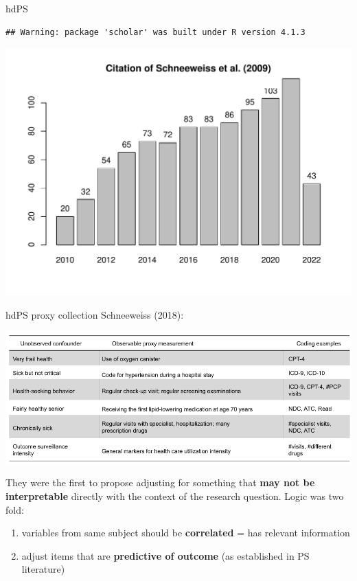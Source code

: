\documentclass[
  ignorenonframetext,
  aspectratio=169]{beamer}
\providecommand{\tightlist}{%
  \setlength{\itemsep}{0pt}\setlength{\parskip}{0pt}}
\begin{document}
\begin{frame}[fragile]{hdPS}
\protect\hypertarget{hdps}{}
\begin{verbatim}
## Warning: package 'scholar' was built under R version 4.1.3
\end{verbatim}

\includegraphics{slideCHSPR_files/figure-beamer/cite-1.pdf}
\end{frame}

\begin{frame}{hdPS proxy collection}
\protect\hypertarget{hdps-proxy-collection}{}
Schneeweiss (2018):

\begin{center}
\includegraphics[width=0.5\linewidth]{code.png}
\end{center}

They were the first to propose adjusting for something that \textbf{may
not be interpretable} directly with the context of the research
question. Logic was two fold:

\begin{enumerate}
\tightlist
\item
  variables from same subject should be \textbf{correlated} = has
  relevant information
\item
  adjust items that are \textbf{predictive of outcome} (as established
  in PS literature)
\end{enumerate}
\end{frame}
\end{document}
